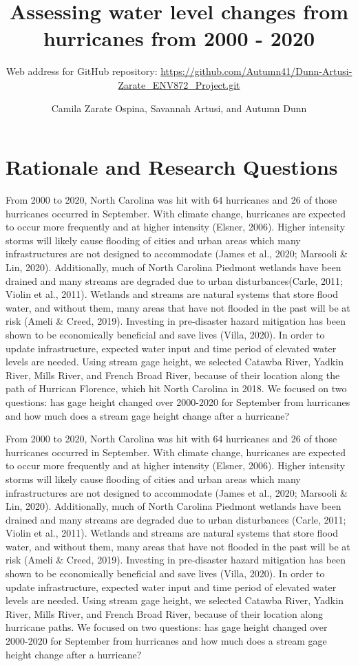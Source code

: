 \documentclass[
  12pt,
]{article}
\title{Assessing water level changes from hurricanes from 2000 - 2020}
\subtitle{Web address for GitHub repository:
\url{https://github.com/Autumn41/Dunn-Artusi-Zarate_ENV872_Project.git}}
\author{Camila Zarate Ospina, Savannah Artusi, and Autumn Dunn}
\date{}
\begin{document}
\maketitle

\newpage
\tableofcontents 
\newpage
\listoftables 
\newpage
\listoffigures 
\newpage

\hypertarget{rationale-and-research-questions}{%
\section{Rationale and Research
Questions}\label{rationale-and-research-questions}}

From 2000 to 2020, North Carolina was hit with 64 hurricanes and 26 of
those hurricanes occurred in September. With climate change, hurricanes
are expected to occur more frequently and at higher intensity (Elsner,
2006). Higher intensity storms will likely cause flooding of cities and
urban areas which many infrastructures are not designed to accommodate
(James et al., 2020; Marsooli \& Lin, 2020). Additionally, much of North
Carolina Piedmont wetlands have been drained and many streams are
degraded due to urban disturbances(Carle, 2011; Violin et al., 2011).
Wetlands and streams are natural systems that store flood water, and
without them, many areas that have not flooded in the past will be at
risk (Ameli \& Creed, 2019). Investing in pre-disaster hazard mitigation
has been shown to be economically beneficial and save lives (Villa,
2020). In order to update infrastructure, expected water input and time
period of elevated water levels are needed. Using stream gage height, we
selected Catawba River, Yadkin River, Mills River, and French Broad
River, because of their location along the path of Hurrican Florence,
which hit North Carolina in 2018. We focused on two questions: has gage
height changed over 2000-2020 for September from hurricanes and how much
does a stream gage height change after a hurricane?

From 2000 to 2020, North Carolina was hit with 64 hurricanes and 26 of
those hurricanes occurred in September. With climate change, hurricanes
are expected to occur more frequently and at higher intensity (Elsner,
2006). Higher intensity storms will likely cause flooding of cities and
urban areas which many infrastructures are not designed to accommodate
(James et al., 2020; Marsooli \& Lin, 2020). Additionally, much of North
Carolina Piedmont wetlands have been drained and many streams are
degraded due to urban disturbances (Carle, 2011; Violin et al., 2011).
Wetlands and streams are natural systems that store flood water, and
without them, many areas that have not flooded in the past will be at
risk (Ameli \& Creed, 2019). Investing in pre-disaster hazard mitigation
has been shown to be economically beneficial and save lives (Villa,
2020). In order to update infrastructure, expected water input and time
period of elevated water levels are needed. Using stream gage height, we
selected Catawba River, Yadkin River, Mills River, and French Broad
River, because of their location along hurricane paths. We focused on
two questions: has gage height changed over 2000-2020 for September from
hurricanes and how much does a stream gage height change after a
hurricane?
\end{document}
